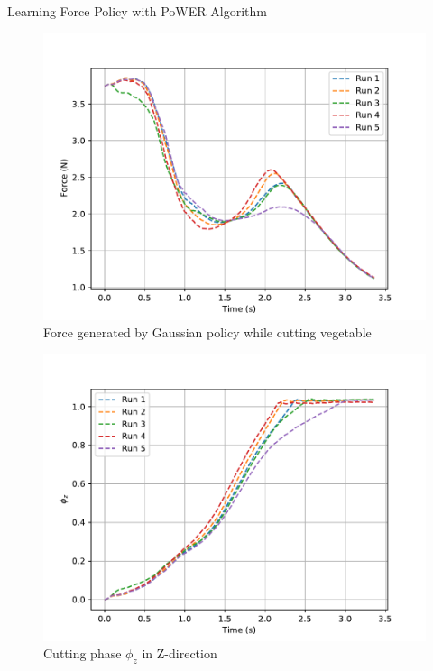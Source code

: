 \documentclass[aspectratio=169]{beamer}
\begin{document}
\begin{frame}
	Learning Force Policy with PoWER Algorithm
	\begin{minipage}[t]{0.49\textwidth}
		\begin{figure}
			\includegraphics[width=\textwidth]{images/exp/cut/power_f2}
			\caption{\scriptsize Force generated by Gaussian policy while cutting vegetable}
		\end{figure}
	\end{minipage}
	\hfill
	\begin{minipage}[t]{0.49\textwidth}
		
		\begin{figure}
			\includegraphics[width=\textwidth]{images/exp/cut/power_ph_z2}
			\caption{\scriptsize Cutting phase $\phi_{z}$ in Z-direction}
		\end{figure}
	\end{minipage}
\end{frame}
\end{document}
